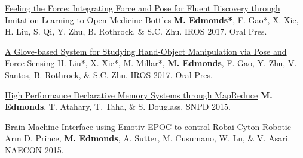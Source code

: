 \begin{cvpublications}
\item \cvpublication
{\href{http://www.mjedmonds.com/papers/IROS17_OpenBottle_final.pdf}{Feeling the Force: Integrating Force and Pose for Fluent Discovery through Imitation Learning to Open Medicine Bottles}} %
{\textbf{M. Edmonds*}, F. Gao*, X. Xie, H. Liu, S. Qi, Y. Zhu, B. Rothrock, \& S.C. Zhu.} %
{IROS 2017.} %
{Oral Pres.} %

\item \cvpublication
{\href{http://www.mjedmonds.com/papers/IROS17_GloveHardware_final.pdf}{A Glove-based System for Studying Hand-Object Manipulation via Pose and Force Sensing}} %
{H. Liu*, X. Xie*, M. Millar*, \textbf{M. Edmonds}, F. Gao, Y. Zhu, V. Santos, B. Rothrock, \& S.C. Zhu.} %
{IROS 2017.} %
{Oral Pres.} %

\item \cvpublication
{\href{http://www.mjedmonds.com/papers/SNPD_2015_HighPerformanceDM_final.pdf}{High Performance Declarative Memory Systems through MapReduce}} %
{\textbf{M. Edmonds}, T. Atahary, T. Taha, \& S. Douglass.} %
{SNPD 2015.} %
{} %


\item \cvpublication
{\href{http://www.mjedmonds.com/papers/bmi-using-emotiv.pdf}{Brain Machine Interface using Emotiv EPOC to control Robai Cyton Robotic Arm}} %
{D. Prince, \textbf{M. Edmonds}, A. Sutter, M. Cusumano, W. Lu, \& V. Asari.} %
{NAECON 2015.} %
{} %

\cvequalcontribution

\end{cvpublications}